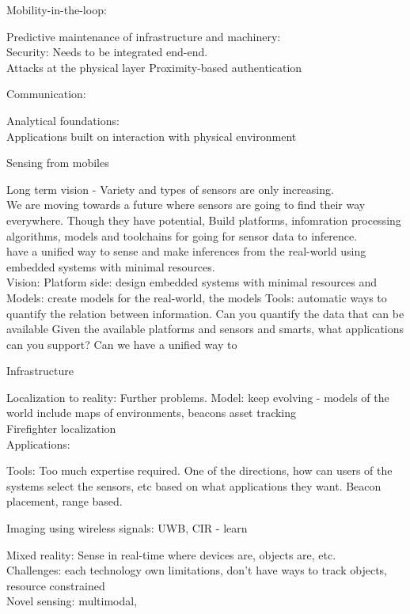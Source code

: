 \documentclass[10pt]{article}
\begin{document}
Mobility-in-the-loop:

Predictive maintenance of infrastructure and machinery:\\

Security:
Needs to be integrated end-end.\\
Attacks at the physical layer 
Proximity-based authentication

Communication:



Analytical foundations:\\

Applications built on interaction with physical environment 

Sensing from mobiles 


Long term vision - 
Variety and types of sensors are only increasing.\\

We are moving towards a future where sensors are going to find their way everywhere. Though they have potential, 
Build platforms, infomration processing algorithms, models and toolchains for going for sensor data to inference.\\

have a unified way to sense and make inferences from the real-world using embedded systems with minimal resources. \\
Vision:
Platform side: design embedded systems with minimal resources and \\
Models: create models for the real-world, the models 
Tools: automatic ways to quantify the relation between information. Can you quantify the data that can be available 
Given the available platforms and sensors and smarts, what applications can you support? Can we have a unified way to 

Infrastructure 

Localization to reality:
Further problems.
Model: keep evolving - models of the world include maps of environments, beacons
asset tracking\\
Firefighter localization\\ 

Applications:

Tools:
Too much expertise required. One of the directions, how can users of the systems select the sensors, etc based on what applications they want.  
Beacon placement, range based.

Imaging using wireless signals:
UWB, CIR - learn 

Mixed reality:
Sense in real-time where devices are, objects are, etc.\\
Challenges: each technology own limitations, don't have ways to track objects, resource constrained\\
Novel sensing: multimodal, \\
\end{document}

